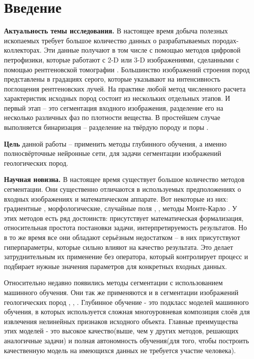 \documentclass[14pt, a4paper, oneside, bold]{extarticle}
\begin{document}
\section*{Введение}

\textbf{Актуальность темы исследования.} В настоящее время добыча полезных ископаемых требует большое количество 
данных о разрабатываемых породах-коллекторах. Эти данные получают в том числе с помощью методов цифровой петрофизики, которые работают с  
2-D или 3-D изображениями, сделанными с помощью рентгеновской томографии \cite{1}. Большинство изображений строения пород представлены в градациях серого, которые указывают на интенсивность поглощения рентгеновских лучей. На практике любой метод численного расчета характеристик исходных пород состоит из нескольких отдельных этапов. 
И первый этап -- это сегментация входного изображения, разделение его
на несколько различных фаз по плотности вещества. В простейшем случае выполняется бинаризация -- разделение на твёрдую породу и поры \cite{2}. 

\textbf{Цель} данной работы -- применить методы глубинного обучения, а именно полносвёрточные нейронные сети, для задачи сегментации изображений геологических пород.

\textbf{Научная новизна.} В настоящее время существует большое количество методов сегментации. Они существенно отличаются в используемых предположениях о входных изображениях и математическом аппарате. Вот некоторые из них: градиентные \cite{16}, морфологические, случайные поля \cite{14}, \cite{15}, методы Монте-Карло \cite{13}. У этих методов есть ряд достоинств: присутствует математическая формализация, относительная простота постановки задачи, интерпретируемость результатов. Но в то же время все они обладают серьёзным недостатком -- в них присутствуют гиперпараметры, которые сильно влияют на качество результата. Это делает затруднительным их применение без оператора, который контролирует процесс и подбирает нужные значения параметров для  конкретных входных данных. 

Относительно недавно появились методы сегментации с использованием машинного обучения. Они так же применяются и в сегментации изображений геологических пород \cite{3}, \cite{4}, \cite{5}. Глубинное обучение - это подкласс моделей машинного обучения, в которых используется сложная многоуровневая композиция слоёв для извлечения нелинейных признаков исходного объекта. Главные преимущества этих моделей - это высокое качество(выше, чем у других методов, решающих аналогичные задачи) и полная автономность обучения(для того, чтобы построить качественную модель на имеющихся данных не требуется участие человека).
\end{document}
